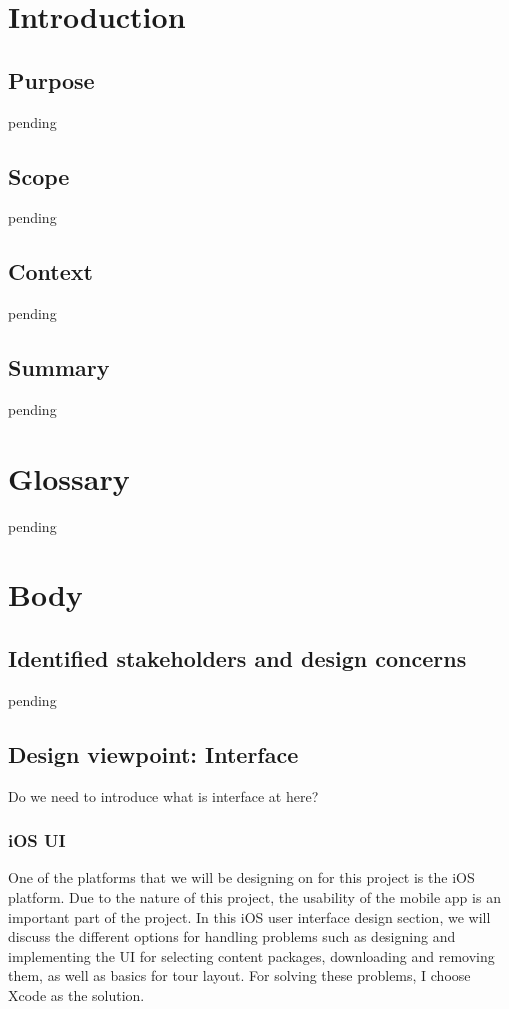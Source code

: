 \documentclass[letterpaper, 10pt,titlepage]{article}
\begin{document}
\tableofcontents
\newpage



\section{Introduction}
\subsection{Purpose}
pending

\subsection{Scope}
pending
                                       
\subsection{Context}
pending

\subsection{Summary}
pending

\vspace{0.3cm}



\section{Glossary}
pending



\section{Body}
\subsection{Identified stakeholders and design concerns}
pending

\subsection{Design viewpoint: Interface}
Do we need to introduce what is interface at here?

\subsubsection{iOS UI}
One of the platforms that we will be designing on for this project is the iOS platform. Due to the nature of this project, the usability of the mobile app is an important part of the project. In this iOS user interface design section, we will discuss the different options for handling problems such as designing and implementing the UI for selecting content packages, downloading and removing them, as well as basics for tour layout. For solving these problems, I choose Xcode as the solution.
\end{document}

